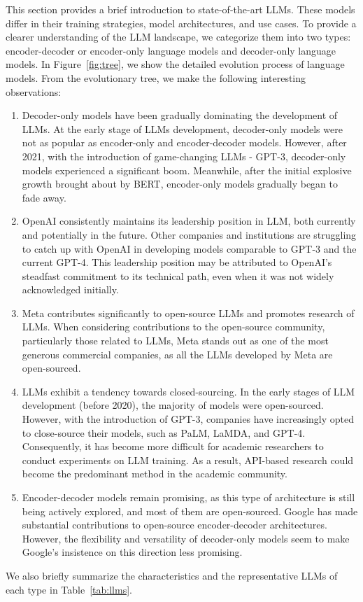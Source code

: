 \documentclass[manuscript,screen, nonacm]{acmart}
\begin{document}
This section provides a brief introduction to state-of-the-art LLMs. These models differ in their training strategies, model architectures, and use cases. To provide a clearer understanding of the LLM landscape, we categorize them into two types: encoder-decoder or encoder-only language models and decoder-only language models. In Figure~\ref{fig:tree}, we show the detailed evolution process of language models. From the evolutionary tree, we make the following interesting observations: 
\begin{enumerate}[label=\alph*)]
    \item Decoder-only models have been gradually dominating the development of LLMs. At the early stage of LLMs development, \textcolor{GreyBlue}{decoder-only} models were not as popular as \textcolor{GreyPink}{encoder-only} and \textcolor{GreyGreen}{encoder-decoder} models. However, after 2021, with the introduction of game-changing LLMs - GPT-3, decoder-only models experienced a significant boom. Meanwhile, after the initial explosive growth brought about by BERT, encoder-only models gradually began to fade away.
    

    
    \item OpenAI consistently maintains its leadership position in LLM, both currently and potentially in the future. Other companies and institutions are struggling to catch up with OpenAI in developing models comparable to GPT-3 and the current GPT-4. This leadership position may be attributed to OpenAI's steadfast commitment to its technical path, even when it was not widely acknowledged initially.
    
    \item Meta contributes significantly to open-source LLMs and promotes research of LLMs. When considering contributions to the open-source community, particularly those related to LLMs, Meta stands out as one of the most generous commercial companies, as all the LLMs developed by Meta are open-sourced.

    \item LLMs exhibit a tendency towards closed-sourcing. In the early stages of LLM development (before 2020), the majority of models were open-sourced. However, with the introduction of GPT-3, companies have increasingly opted to close-source their models, such as PaLM, LaMDA, and GPT-4. Consequently, it has become more difficult for academic researchers to conduct experiments on LLM training. As a result, API-based research could become the predominant method in the academic community.

    \item Encoder-decoder models remain promising, as this type of architecture is still being actively explored, and most of them are open-sourced. Google has made substantial contributions to open-source encoder-decoder architectures. However, the flexibility and versatility of decoder-only models seem to make Google's insistence on this direction less promising.
    
  
\end{enumerate}
We also briefly summarize the characteristics and the representative LLMs of each type in Table~\ref{tab:llms}.
\end{document}
